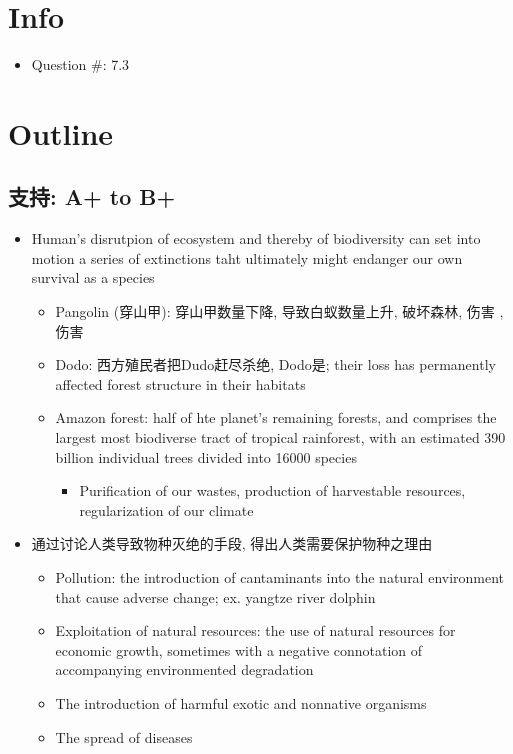 \documentclass{article}
\begin{document}
  \section{Info}
    \begin{itemize}
      \item Question \#: 7.3
    \end{itemize}

  \section{Outline}

    \subsection{支持: A+ to B+}

      \begin{itemize}
        \item Human's disrutpion of ecosystem and thereby of biodiversity can
        set into motion a series of extinctions taht ultimately might endanger
        our own survival as a species
        \begin{itemize}
          \item Pangolin (穿山甲): 穿山甲数量下降, 导致白蚁数量上升, 破坏森林, 伤害
          , 伤害
          \item Dodo: 西方殖民者把Dudo赶尽杀绝, Dodo是; their loss has permanently affected forest structure in their
          habitats
          \item Amazon forest: half of hte planet's remaining forests, and
          comprises the largest most biodiverse tract of tropical rainforest, with
          an estimated 390 billion individual trees divided into 16000 species
          \begin{itemize}
            \item Purification of our wastes, production of harvestable resources,
            regularization of our climate
          \end{itemize}
        \end{itemize}

        \item 通过讨论人类导致物种灭绝的手段, 得出人类需要保护物种之理由
        \begin{itemize}
          \item Pollution: the introduction of cantaminants into the natural
          environment that cause adverse change; ex. yangtze river dolphin
          \item Exploitation of natural resources: the use of natural resources
          for economic growth, sometimes with a negative connotation of
          accompanying environmented degradation
          \item The introduction of harmful exotic and nonnative organisms
          \item The spread of diseases
        \end{itemize}
      \end{itemize}
\end{document}
